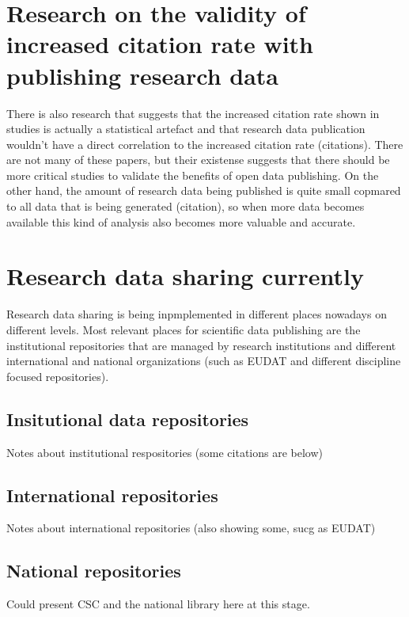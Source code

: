 \section[Validity of the benefit research]{Research on the validity of increased citation rate with publishing
research data}

There is also research that suggests that the increased citation rate shown in
studies is actually a statistical artefact and that research data publication
wouldn't have a direct correlation to the increased citation rate (citations).
There are not many of these papers, but their existense suggests that there
should be more critical studies to validate the benefits of open data
publishing. On the other hand, the amount of research data being published
is quite small copmared to all data that is being generated (citation), so
when more data becomes available this kind of analysis also becomes more
valuable and accurate.

\section{Research data sharing currently}

Research data sharing is being inpmplemented in different places nowadays on
different levels. Most relevant places for scientific data publishing are the
institutional repositories that are managed by research institutions and
different international and national organizations (such as EUDAT and
different discipline focused repositories).

\subsection{Insitutional data repositories}

Notes about institutional respositories (some citations are below)

\subsection{International repositories}

Notes about international repositories (also showing some, sucg as EUDAT)

\subsection{National repositories}

Could present CSC and the national library here at this stage.

